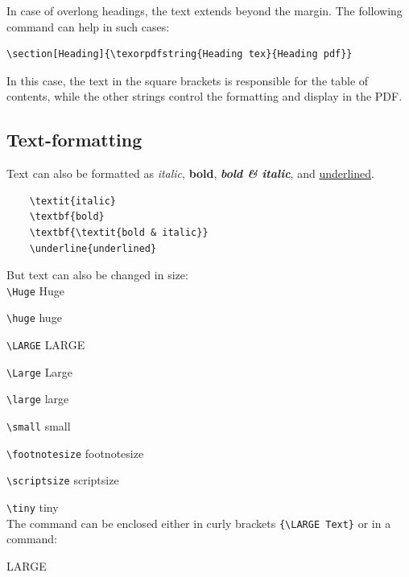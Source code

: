 In case of overlong headings, the text extends beyond the margin. The following command can help in such cases:

\begin{verbatim}
\section[Heading]{\texorpdfstring{Heading tex}{Heading pdf}}
\end{verbatim}

In this case, the text in the square brackets is responsible for the table of contents, while the other strings control the formatting and display in the PDF.


\subsection{Text-formatting}

Text can also be formatted as \textit{italic}, \textbf{bold}, \textbf{\textit{bold \& italic}}, and \underline{underlined}.

\begin{verbatim}
    \textit{italic}
    \textbf{bold}
    \textbf{\textit{bold & italic}}
    \underline{underlined}
\end{verbatim}

But text can also be changed in size:\\

\verb|\Huge| \hfill {\Huge Huge}

\verb|\huge| \hfill {\huge huge}

\verb|\LARGE| \hfill {\LARGE LARGE}

\verb|\Large| \hfill {\Large Large}

\verb|\large| \hfill {\large large}

\verb|\small| \hfill {\small small}

\verb|\footnotesize| \hfill {\footnotesize footnotesize}

\verb|\scriptsize| \hfill {\scriptsize scriptsize}

\verb|\tiny| \hfill {\tiny tiny}\\

The command can be enclosed either in curly brackets \verb|{\LARGE Text}| or in a command:

\begin{center}
    \begin{LARGE}
        LARGE
    \end{LARGE}
\end{center}

